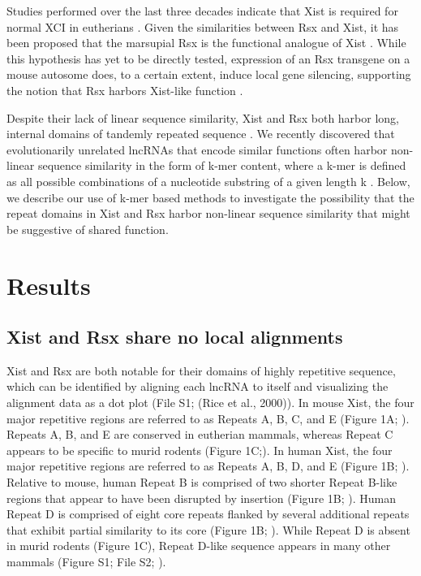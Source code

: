 Studies performed over the last three decades indicate that Xist is required for normal XCI in eutherians \cite{Balaton2018TheChromosome,Brockdorff2018LocalNcRNA,DaRocha2017NovelConformation,Sahakyan2018TheCompensation}. Given the similarities between Rsx and Xist, it has been proposed that the marsupial Rsx is the functional analogue of Xist \cite{Grant2012RsxInactivation}. While this hypothesis has yet to be directly tested, expression of an Rsx transgene on a mouse autosome does, to a certain extent, induce local gene silencing, supporting the notion that Rsx harbors Xist-like function \cite{Grant2012RsxInactivation}.

Despite their lack of linear sequence similarity, Xist and Rsx both harbor long, internal domains of tandemly repeated sequence \cite{Grant2012RsxInactivation,Johnson2018AdaptationGenome}. We recently discovered that evolutionarily unrelated lncRNAs that encode similar functions often harbor non-linear sequence similarity in the form of k-mer content, where a k-mer is defined as all possible combinations of a nucleotide substring of a given length k \cite{Kirk2018FunctionalContent}. Below, we describe our use of k-mer based methods to investigate the possibility that the repeat domains in Xist and Rsx harbor non-linear sequence similarity that might be suggestive of shared function.

\section{Results}
\subsection{Xist and Rsx share no local alignments}
Xist and Rsx are both notable for their domains of highly repetitive sequence, which can be identified by aligning each lncRNA to itself and visualizing the alignment data as a dot plot (File S1; (Rice et al., 2000)). In mouse Xist, the four major repetitive regions are referred to as Repeats A, B, C, and E (Figure 1A; \cite{Brockdorff10TheNucleus.}). Repeats A, B, and E are conserved in eutherian mammals, whereas Repeat C appears to be specific to murid rodents (Figure 1C;\cite{Nesterova2001CharacterizationSequence,Yen2007AEutheria}). In human Xist, the four major repetitive regions are referred to as Repeats A, B, D, and E (Figure 1B; \cite{Brown10TheNucleus.}). Relative to mouse, human Repeat B is comprised of two shorter Repeat B-like regions that appear to have been disrupted by insertion (Figure 1B; \cite{Nesterova2001CharacterizationSequence,Yen2007AEutheria}). Human Repeat D is comprised of eight core repeats flanked by several additional repeats that exhibit partial similarity to its core (Figure 1B; \cite{Brown10TheNucleus.,Nesterova2001CharacterizationSequence,Yen2007AEutheria}). While Repeat D is absent in murid rodents (Figure 1C), Repeat D-like sequence appears in many other mammals (Figure S1; File S2; \cite{Nesterova2001CharacterizationSequence,Yen2007AEutheria}).

